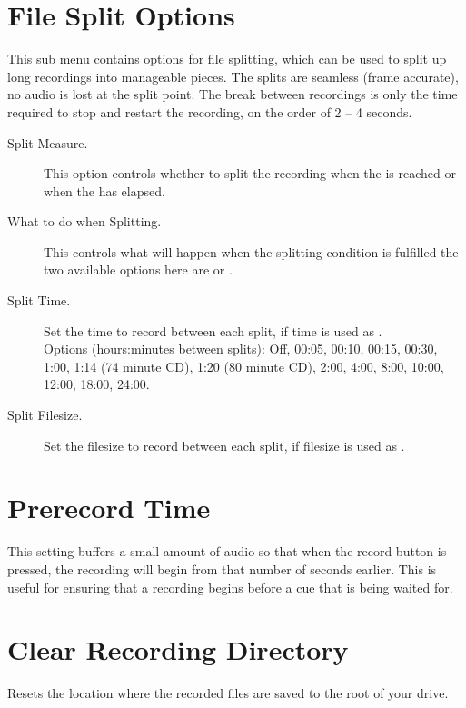 \section{File Split Options}
  This sub menu contains options for file splitting, which can be used to split
  up long recordings into manageable pieces. The splits are seamless (frame
  accurate), no audio is lost at the split point. The break between recordings
  is only the time required to stop and restart the recording, on the order of
  2 -- 4 seconds.
  \begin{description}
    \item[Split Measure.]
      This option controls whether to split the recording when the
       is reached or when the
       has elapsed.

    \item[What to do when Splitting.]
      This controls what will happen when the splitting condition is
      fulfilled the two available options here are
       or .

    \item[Split Time.]
      Set the time to record between each split, if time is used as
      .\\
      Options (hours:minutes between splits): Off, 00:05, 00:10, 00:15, 00:30,
      1:00, 1:14 (74 minute CD), 1:20 (80 minute CD), 2:00, 4:00, 8:00, 10:00,
      12:00, 18:00, 24:00.

    \item[Split Filesize.]
      Set the filesize to record between each split, if filesize is used as
      .

  \end{description}

\section{Prerecord Time}
    This setting buffers a small amount of audio so that when the record button
    is pressed, the recording will begin from that number of seconds earlier.
    This is useful for ensuring that a recording begins before a cue that is
    being waited for.

\section{Clear Recording Directory}
    Resets the location where the recorded files are saved to the root of your
    \daps{} drive.

